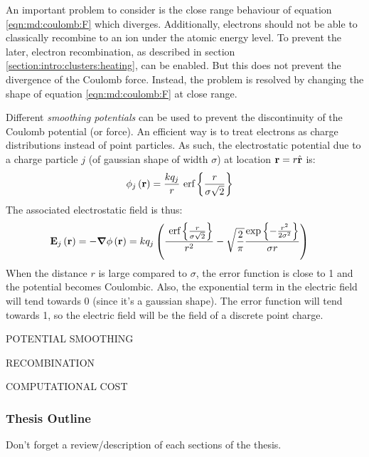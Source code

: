 An important problem to consider is the close range behaviour of equation
\eqref{eqn:md:coulomb:F} which diverges. Additionally, electrons should not be
able to classically recombine to an ion under the atomic energy level. To
prevent the later, electron recombination, as described in section
\ref{section:intro:clusters:heating}, can be enabled. But this does not prevent
the divergence of the Coulomb force. Instead, the problem is resolved by
changing the shape of equation \eqref{eqn:md:coulomb:F} at close range.

Different \textit{smoothing potentials} can be used to prevent the
discontinuity of the Coulomb potential (or force). An efficient way is to treat
electrons as charge distributions instead of point particles. As such, the
electrostatic potential due to a charge particle $j$ (of gaussian shape of
width $\sigma$) at location $\textbf{r} = r \hat{\textbf{r}}$ is:
\begin{align}
\phi_{j}\left( \textbf{r} \right) & = \frac{k q_j}{r} ~\textrm{erf} \left\{\frac{r}{\sigma
\sqrt{2}}\right\}
\end{align}
The associated electrostatic field is thus:
\begin{align}
\textbf{E}_{j}\left( \textbf{r} \right) & = -\bm{\nabla} \phi\left( \textbf{r} \right) = k q_j \left( 
    \frac{ ~\textrm{erf} \left\{\frac{r}{\sigma\sqrt{2}}\right\} }{r^2}
    - \sqrt{\frac{2}{\pi}} \frac{ \exp{ \left\{ -\frac{r^2}{2 \sigma^2} \right\}} }{\sigma r}
 \right)
\end{align}
When the distance $r$ is large compared to $\sigma$, the error function
is close to 1 and the potential becomes Coulombic. Also, the exponential
term in the electric field will tend towards 0 (since it's a gaussian shape).
The error function will tend towards 1, so the electric field will
be the field of a discrete point charge.







POTENTIAL SMOOTHING

RECOMBINATION

COMPUTATIONAL COST



\subsubsection{Thesis Outline}
Don't forget a review/description of each sections of the thesis.



